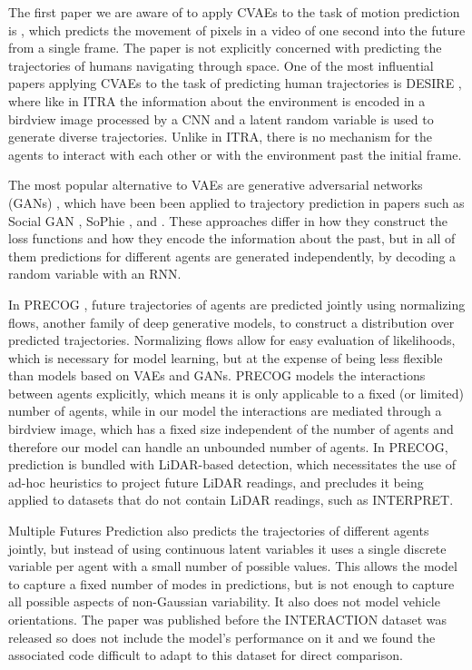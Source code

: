 \documentclass[letterpaper, 10 pt, conference]{ieeeconf}
\begin{document}
The first paper we are aware of to apply CVAEs to the task of motion prediction is \cite{walker_uncertain_2016}, which predicts the movement of pixels in a video of one second into the future from a single frame. The paper is not explicitly concerned with predicting the trajectories of humans navigating through space. One of the most influential papers applying CVAEs to the task of predicting human trajectories is DESIRE \cite{lee_desire_2017}, where like in ITRA the information about the environment is encoded in a birdview image processed by a CNN and a latent random variable is used to generate diverse trajectories. Unlike in ITRA, there is no mechanism for the agents to interact with each other or with the environment past the initial frame.

The most popular alternative to VAEs are generative adversarial networks (GANs) \cite{goodfellow_generative_2014}, which have been been applied to trajectory prediction in papers such as Social GAN \cite{gupta_social_2018}, SoPhie \cite{sadeghian_sophie_2018}, and \cite{zhao_multi-agent_2019}. These approaches differ in how they construct the loss functions and how they encode the information about the past, but in all of them predictions for different agents are generated independently, by decoding a random variable with an RNN.

In PRECOG \cite{rhinehart_precog_2019}, future trajectories of agents are predicted jointly using normalizing flows, another family of deep generative models, to construct a distribution over predicted trajectories. Normalizing flows allow for easy evaluation of likelihoods, which is necessary for model learning, but at the expense of being less flexible than models based on VAEs and GANs. PRECOG models the interactions between agents explicitly, which means it is only applicable to a fixed (or limited) number of agents, while in our model the interactions are mediated through a birdview image, which has a fixed size independent of the number of agents and therefore our model can handle an unbounded number of agents. In PRECOG, prediction is bundled with LiDAR-based detection, which necessitates the use of ad-hoc heuristics to project future LiDAR readings, and precludes it being applied to datasets that do not contain LiDAR readings, such as INTERPRET.

Multiple Futures Prediction \cite{tang_multiple_2019} also predicts the trajectories of different agents jointly, but instead of using continuous latent variables it uses a single discrete variable per agent with a small number of possible values. This allows the model to capture a fixed number of modes in predictions, but is not enough to capture all possible aspects of non-Gaussian variability. It also does not model vehicle orientations. The paper was published before the INTERACTION dataset was released so does not include the model's performance on it and we found the associated code difficult to adapt to this dataset for direct comparison.
\end{document}
